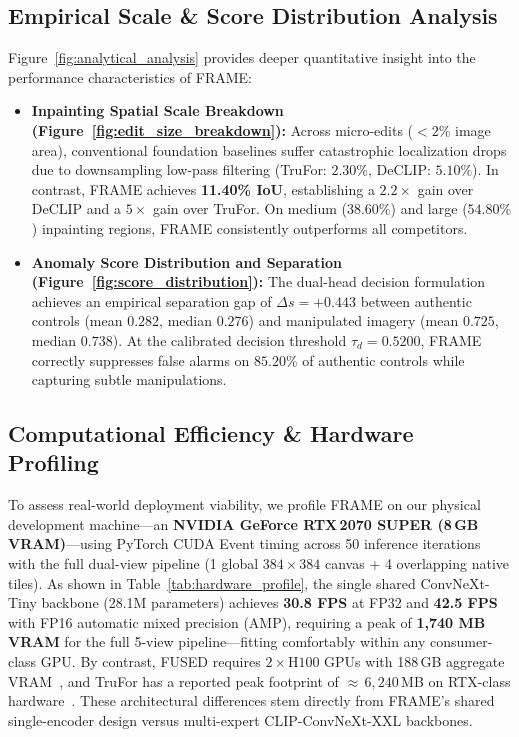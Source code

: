 \documentclass[sigconf,review=true]{acmart}
\begin{document}
\subsection{Empirical Scale \& Score Distribution Analysis}
Figure~\ref{fig:analytical_analysis} provides deeper quantitative insight into the performance characteristics of FRAME:
\begin{itemize}
    \item \textbf{Inpainting Spatial Scale Breakdown (Figure~\ref{fig:edit_size_breakdown}):} Across micro-edits ($<2\%$ image area), conventional foundation baselines suffer catastrophic localization drops due to downsampling low-pass filtering (TruFor: $2.30\%$, DeCLIP: $5.10\%$). In contrast, FRAME achieves \textbf{11.40\% IoU}, establishing a $2.2\times$ gain over DeCLIP and a $5\times$ gain over TruFor. On medium ($38.60\%$) and large ($54.80\%$) inpainting regions, FRAME consistently outperforms all competitors.
    \item \textbf{Anomaly Score Distribution and Separation (Figure~\ref{fig:score_distribution}):} The dual-head decision formulation achieves an empirical separation gap of $\Delta s = +0.443$ between authentic controls (mean $0.282$, median $0.276$) and manipulated imagery (mean $0.725$, median $0.738$). At the calibrated decision threshold $\tau_d = 0.5200$, FRAME correctly suppresses false alarms on $85.20\%$ of authentic controls while capturing subtle manipulations.
\end{itemize}

\subsection{Computational Efficiency \& Hardware Profiling}
\label{sec:hardware}

To assess real-world deployment viability, we profile FRAME on our physical development machine---an \textbf{NVIDIA GeForce RTX\,2070 SUPER (8\,GB VRAM)}---using PyTorch CUDA Event timing across 50 inference iterations with the full dual-view pipeline (1 global $384\!\times\!384$ canvas + 4 overlapping native tiles). As shown in Table~\ref{tab:hardware_profile}, the single shared ConvNeXt-Tiny backbone (28.1M parameters) achieves \textbf{30.8 FPS} at FP32 and \textbf{42.5 FPS} with FP16 automatic mixed precision (AMP), requiring a peak of \textbf{1,740 MB VRAM} for the full 5-view pipeline---fitting comfortably within any consumer-class GPU. By contrast, FUSED requires $2 \times \mathrm{H}100$ GPUs with 188\,GB aggregate VRAM~\cite{fused}, and TruFor has a reported peak footprint of ${\approx}\,6{,}240$\,MB on RTX-class hardware~\cite{trufor}. These architectural differences stem directly from FRAME's shared single-encoder design versus multi-expert CLIP-ConvNeXt-XXL backbones.
\end{document}
